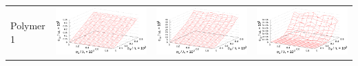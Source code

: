 \documentclass[11pt,a4paper]{article}
\theoremstyle{definition}
\begin{document}
\begin{table}[h]
\begin{tabular}{l | c c c}
	\begin{rotate}{90}Polymer 1\end{rotate} &	\includegraphics[scale=0.4]{figs/even/p1.txt_coeff0.dat.eps} & \includegraphics[scale=0.4]{figs/even/p1.txt_coeff1.dat.eps} & \includegraphics[scale=0.4]{figs/even/p1.txt_coeff2.dat.eps} \\

\end{tabular}
\end{table}
\end{document}
